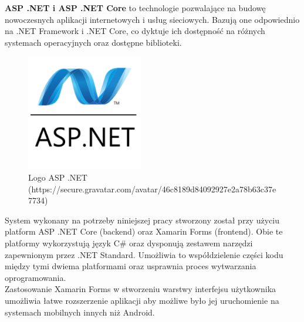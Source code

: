 \textbf{ASP .NET i ASP .NET Core} to technologie pozwalające na budowę nowoczesnych aplikacji internetowych i usług sieciowych. Bazują one odpowiednio na .NET Framework i .NET Core, co dyktuje ich dostępność na różnych systemach operacyjnych oraz dostępne biblioteki.
\begin{figure}[!ht]
	\begin{center}
		\includegraphics[width=2in]{img/logo/aspdotnet.png}
		\caption{Logo ASP .NET (https://secure.gravatar.com/avatar/46c8189d84092927e2a78b63c37e7734)}
		\label{aspdotnet_logo}
	\end{center}
\end{figure}

System wykonany na potrzeby niniejszej pracy stworzony został przy użyciu platform ASP .NET Core (backend) oraz Xamarin Forms (frontend). Obie te platformy wykorzystują język C\# oraz dysponują zestawem narzędzi zapewnionym przez .NET Standard. Umożliwia to współdzielenie części kodu między tymi dwiema platformami oraz usprawnia proces wytwarzania oprogramowania.\\
Zastosowanie Xamarin Forms w stworzeniu warstwy interfejsu użytkownika umożliwia łatwe rozszerzenie aplikacji aby możliwe było jej uruchomienie na systemach mobilnych innych niż Android.
